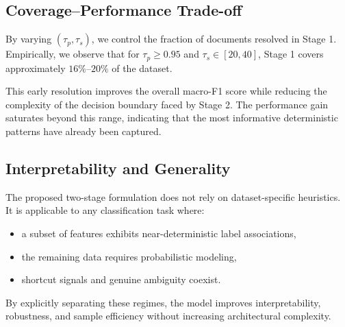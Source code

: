 \subsection{Coverage--Performance Trade-off}

By varying $(\tau_p, \tau_s)$, we control the fraction of documents resolved in Stage 1.
Empirically, we observe that for $\tau_p \ge 0.95$ and $\tau_s \in [20,40]$, Stage 1 covers approximately $16\%$--$20\%$ of the dataset.

This early resolution improves the overall macro-F1 score while reducing the complexity of the decision boundary faced by Stage 2.
The performance gain saturates beyond this range, indicating that the most informative deterministic patterns have already been captured.
\subsection{Interpretability and Generality}

The proposed two-stage formulation does not rely on dataset-specific heuristics.
It is applicable to any classification task where:
\begin{itemize}
	\item a subset of features exhibits near-deterministic label associations,
	\item the remaining data requires probabilistic modeling,
	\item shortcut signals and genuine ambiguity coexist.
\end{itemize}

By explicitly separating these regimes, the model improves interpretability, robustness, and sample efficiency without increasing architectural complexity.

